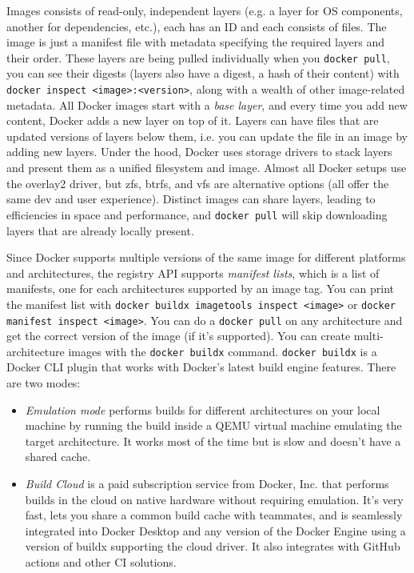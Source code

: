 \documentclass[table, xcdraw]{article}%
\begin{document}
Images consists of read-only, independent layers (e.g. a layer for OS components, another for dependencies, etc.), each has an ID and each consists of files. The image is just a manifest file with metadata specifying the required layers and their order. These layers are being pulled individually when you \texttt{docker pull}, you can see their digests (layers also have a digest, a hash of their content) with \texttt{docker inspect <image>:<version>}, along with a wealth of other image-related metadata. All Docker images start with a \emph{base layer}, and every time you add new content, Docker adds a new layer on top of it. Layers can have files that are updated versions of layers below them, i.e. you can update the file in an image by adding new layers. Under the hood, Docker uses storage drivers to stack layers and present them as a unified filesystem and image. Almost all Docker setups use the overlay2 driver, but zfs, btrfs, and vfs are alternative options (all offer the same dev and user experience). Distinct images can share layers, leading to efficiencies in space and performance, and \texttt{docker pull} will skip downloading layers that are already locally present.

Since Docker supports multiple versions of the same image for different platforms and architectures, the registry API supports \emph{manifest lists}, which is a list of manifests, one for each architectures supported by an image tag. You can print the manifest list with \texttt{docker buildx imagetools inspect <image>} or \texttt{docker manifest inspect <image>}. You can do a \texttt{docker pull} on any architecture and get the correct version of the image (if it's supported). You can create multi-architecture images with the \texttt{docker buildx} command. \texttt{docker buildx} is a Docker CLI plugin that works with Docker’s latest build engine features. There are two modes:

\begin{itemize}
    \item \emph{Emulation mode} performs builds for different architectures on your local machine by running the build inside a QEMU virtual machine emulating the target architecture. It works most of the time but is slow and doesn’t have a shared cache.
    \item \emph{Build Cloud} is a paid subscription service from Docker, Inc. that performs builds in the cloud on native hardware without requiring emulation. It’s very fast, lets you share a common build cache with teammates, and is seamlessly integrated into Docker Desktop and any version of the Docker Engine using a version of buildx supporting the cloud driver. It also integrates with GitHub actions and other CI solutions.
\end{itemize}
\end{document}
